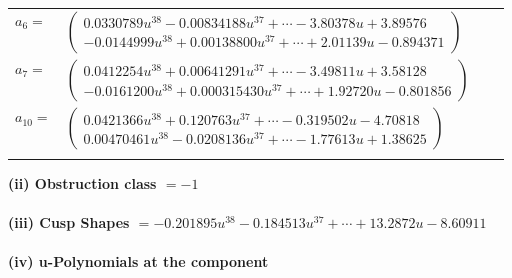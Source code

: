 \documentclass[1p]{elsarticle_modified}
\theoremstyle{definition}
\begin{document}
\begin{tabular}{m{7pt} m{180pt} m{7pt} m{180pt} }
\flushright $a_{6}=$&$\begin{pmatrix}0.0330789 u^{38}-0.00834188 u^{37}+\cdots-3.80378 u+3.89576\\-0.0144999 u^{38}+0.00138800 u^{37}+\cdots+2.01139 u-0.894371\end{pmatrix}$ \\
\flushright $a_{7}=$&$\begin{pmatrix}0.0412254 u^{38}+0.00641291 u^{37}+\cdots-3.49811 u+3.58128\\-0.0161200 u^{38}+0.000315430 u^{37}+\cdots+1.92720 u-0.801856\end{pmatrix}$ \\
\flushright $a_{10}=$&$\begin{pmatrix}0.0421366 u^{38}+0.120763 u^{37}+\cdots-0.319502 u-4.70818\\0.00470461 u^{38}-0.0208136 u^{37}+\cdots-1.77613 u+1.38625\end{pmatrix}$\\&\end{tabular}
\flushleft \textbf{(ii) Obstruction class $= -1$}\\~\\
\flushleft \textbf{(iii) Cusp Shapes $= -0.201895 u^{38}-0.184513 u^{37}+\cdots+13.2872 u-8.60911$}\\~\\
\newpage\renewcommand{\arraystretch}{1}
\flushleft \textbf{(iv) u-Polynomials at the component}\newline \\
\end{document}
